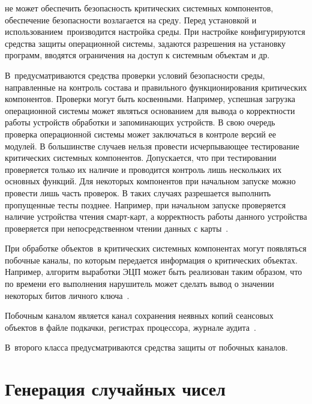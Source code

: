 
\TOE не может обеспечить безопасность критических системных компонентов,
обеспечение безопасности возлагается на среду.
%
Перед установкой и использованием~\TOE производится настройка среды. 
При настройке конфигурируются средства защиты операционной системы, 
задаются разрешения на установку программ, 
вводятся ограничения на доступ к системным объектам и др.

В~\TOE предусматриваются средства проверки  
условий безопасности среды, 
направленные на контроль состава и правильного 
функционирования критических компонентов.
%
Проверки могут быть косвенными. 
Например, успешная загрузка операционной системы
может являться основанием для вывода о корректности работы
устройств обработки и запоминающих устройств.
В свою очередь проверка
операционной системы может заключаться в контроле версий ее модулей.
%
В большинстве случаев нельзя провести исчерпывающее тестирование 
критических системных компонентов. Допускается, что при тестировании 
проверяется только их наличие и проводится контроль лишь нескольких 
их основных функций.
%
Для некоторых компонентов при начальном запуске можно провести лишь часть 
проверок. В таких случаях разрешается выполнить пропущенные тесты позднее.
Например, при начальном запуске проверяется
наличие устройства чтения смарт-карт, 
а корректность работы данного устройства проверяется 
при непосредственном чтении данных с карты~.

При обработке объектов~\TOE в критических системных компонентах
могут появляться побочные каналы, по которым передается информация
о критических объектах. 
%
Например, алгоритм выработки ЭЦП может быть реализован таким образом,
что по времени его выполнения нарушитель может сделать вывод 
о значении некоторых битов личного ключа~. 

Побочным каналом является канал сохранения неявных 
копий сеансовых объектов в файле подкачки, регистрах процессора, 
журнале аудита~.

В~\TOE второго класса предусматриваются средства защиты от побочных каналов.

\section{Генерация случайных чисел}

